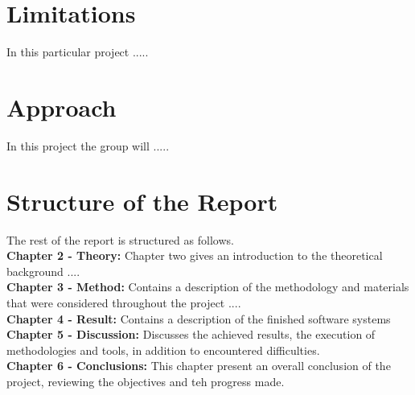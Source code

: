 \section{Limitations}
In this particular project .....  

\section{Approach}
In this project the group will .....
\newpage

\section{Structure of the Report}

The rest of the report is structured as follows.\\
\break
\textbf{Chapter 2 - Theory:} Chapter two gives an introduction to the theoretical background .... \\
\break
\textbf{Chapter 3 - Method:} Contains a description of the methodology and materials that were considered throughout the project ....\\
\break
\textbf{Chapter 4 - Result:} Contains a description of the finished software systems \\
\break
\textbf{Chapter 5 - Discussion:} Discusses the achieved results, the execution of methodologies and tools, in addition to encountered difficulties.\\
\break
\textbf{Chapter 6 - Conclusions:} This chapter present an overall conclusion of the project, reviewing the objectives and teh progress made. \\